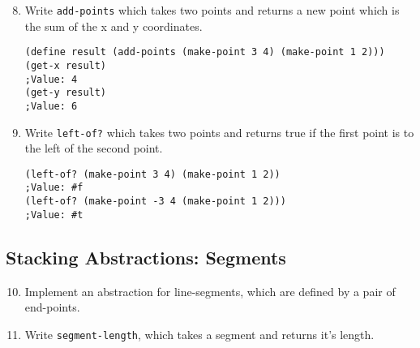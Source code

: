 \begin{enumerate}
\setcounter{enumi}{7}
\item Write {\tt add-points} which takes two points and returns a new
point which is the sum of the x and y coordinates.
\begin{verbatim}
(define result (add-points (make-point 3 4) (make-point 1 2)))
(get-x result)
;Value: 4
(get-y result)
;Value: 6
\end{verbatim}
\vspace{1in}

\item Write {\tt left-of?} which takes two points and returns true if
the first point is to the left of the second point.

\begin{verbatim}
(left-of? (make-point 3 4) (make-point 1 2))
;Value: #f
(left-of? (make-point -3 4 (make-point 1 2)))
;Value: #t
\end{verbatim}
\vspace{1in}
\end{enumerate}

\subsection*{Stacking Abstractions: Segments}

\begin{enumerate}
\setcounter{enumi}{9}
\item Implement an abstraction for line-segments, which are defined by
a pair of end-points.
\vspace{2in}

\item Write {\tt segment-length}, which takes a segment and returns
it's length.
\vspace{1in}
\end{enumerate}


